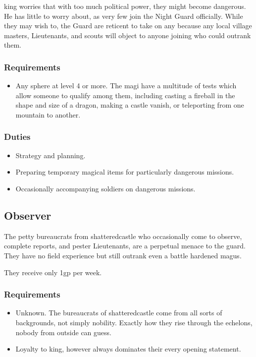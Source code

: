 \begin{multicols}{2}
\Gls{king} worries that with too much political power, they might become dangerous.
He has little to worry about, as very few join the Night Guard officially.
While they may wish to, the Guard are reticent to take on any because any local village masters, Lieutenants, and scouts will object to anyone joining who could outrank them.

\subsubsection{Requirements}

\begin{itemize}
  \item
  Any sphere at level 4 or more.
  The magi have a multitude of tests which allow someone to qualify among them, including casting a fireball in the shape and size of a dragon, making a castle vanish, or teleporting from one mountain to another.
\end{itemize}

\subsubsection{Duties}

\begin{itemize}
  \item
  Strategy and planning.
  \item
  Preparing temporary magical items for particularly dangerous missions.
  \item
  Occasionally accompanying soldiers on dangerous missions.
\end{itemize}

\subsection{Observer}

The petty bureaucrats from \gls{shatteredcastle} who occasionally come to observe, complete reports, and pester Lieutenants, are a perpetual menace to the \gls{guard}.
They have no field experience but still outrank even a battle hardened magus.

They receive only 1gp per week.

\subsubsection{Requirements}

\begin{itemize}
  \item
  Unknown.
  The bureaucrats of \gls{shatteredcastle} come from all sorts of backgrounds, not simply nobility.
  Exactly how they rise through the echelons, nobody from outside can guess.
  \item
  Loyalty to \gls{king}, however always dominates their every opening statement.
\end{itemize}


\end{multicols}
